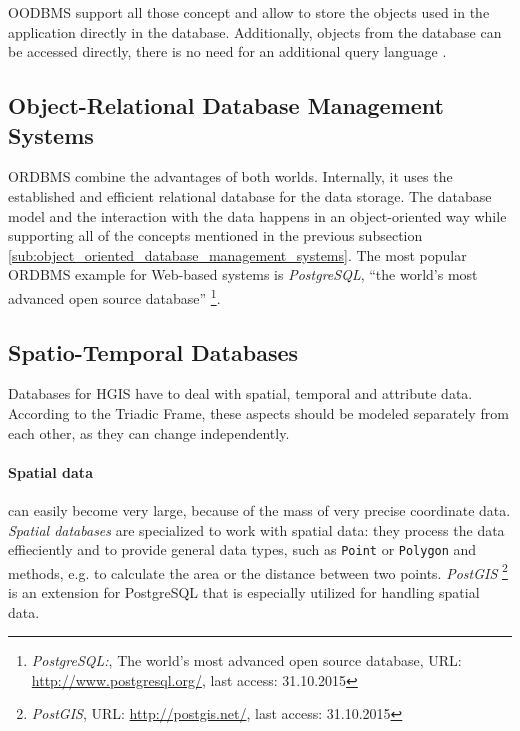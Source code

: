 OODBMS support all those concept and allow to store the objects used in the application directly in the database. Additionally, objects from the database can be accessed directly, there is no need for an additional query language \cite{oodbms}.


\subsection{Object-Relational Database Management Systems} %
\label{sub:object_relational_database_management_systems}

ORDBMS combine the advantages of both worlds. Internally, it uses the established and efficient relational database for the data storage. The database model and the interaction with the data happens in an object-oriented way while supporting all of the concepts mentioned in the previous subsection \ref{sub:object_oriented_database_management_systems}. The most popular ORDBMS example for Web-based systems is \emph{PostgreSQL}, ``the world's most advanced open source database''
\footnote{
  \emph{PostgreSQL:},
  The world's most advanced open source database,
  URL: \url{http://www.postgresql.org/},
  last access: 31.10.2015
}.


\subsection{Spatio-Temporal Databases} %
\label{par:spatial_databases}

Databases for HGIS have to deal with spatial, temporal and attribute data. According to the Triadic Frame, these aspects should be modeled separately from each other, as they can change independently.

\paragraph{Spatial data} %
\label{par:spatial_data}

can easily become very large, because of the mass of very precise coordinate data. \emph{Spatial databases} are specialized to work with spatial data: they process the data effieciently and to provide general data types, such as \texttt{Point} or \texttt{Polygon} and methods, e.g. to calculate the area or the distance between two points. \emph{PostGIS}
\footnote{
  \emph{PostGIS},
  URL: \url{http://postgis.net/},
  last access: 31.10.2015
}
is an extension for PostgreSQL that is especially utilized for handling spatial data.

